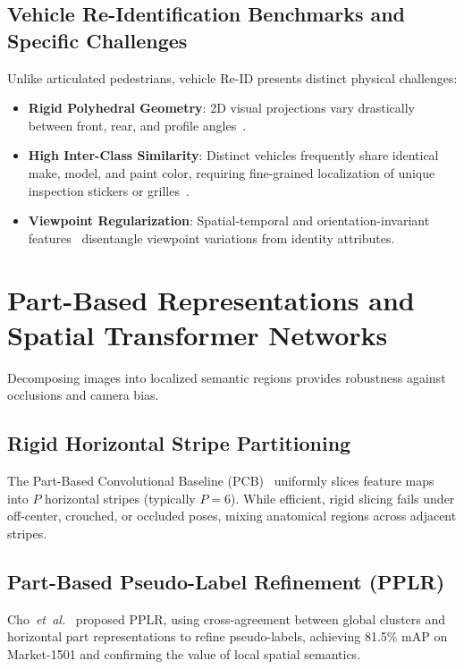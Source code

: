 \subsection{Vehicle Re-Identification Benchmarks and Specific Challenges}
\label{subsec:vehicle_reid_lit}

Unlike articulated pedestrians, vehicle Re-ID presents distinct physical challenges:
\begin{itemize}[leftmargin=*]
    \item \textbf{Rigid Polyhedral Geometry}: 2D visual projections vary drastically between front, rear, and profile angles~\cite{liu2016deep}.
    \item \textbf{High Inter-Class Similarity}: Distinct vehicles frequently share identical make, model, and paint color, requiring fine-grained localization of unique inspection stickers or grilles~\cite{liu2016deepveri,lou2019veriwide}.
    \item \textbf{Viewpoint Regularization}: Spatial-temporal and orientation-invariant features~\cite{wang2017orientation,khorramshahi2019dual} disentangle viewpoint variations from identity attributes.
\end{itemize}

\section{Part-Based Representations and Spatial Transformer Networks}
\label{sec:lit_part_models}

Decomposing images into localized semantic regions provides robustness against occlusions and camera bias.

\subsection{Rigid Horizontal Stripe Partitioning}
\label{subsec:pcb_lit}

The Part-Based Convolutional Baseline (PCB)~\cite{sun2018beyond} uniformly slices feature maps into $P$ horizontal stripes (typically $P=6$). While efficient, rigid slicing fails under off-center, crouched, or occluded poses, mixing anatomical regions across adjacent stripes.

\subsection{Part-Based Pseudo-Label Refinement (PPLR)}
\label{subsec:pplr_lit}

Cho~\textit{et~al.}~\cite{cho2022pplr} proposed PPLR, using cross-agreement between global clusters and horizontal part representations to refine pseudo-labels, achieving 81.5\% mAP on Market-1501 and confirming the value of local spatial semantics.

